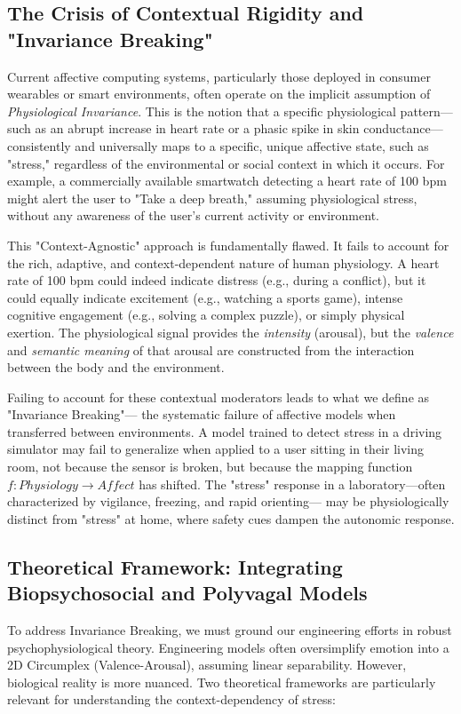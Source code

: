 \documentclass[journal]{IEEEtran}
\begin{document}
\subsection{The Crisis of Contextual Rigidity and "Invariance Breaking"}
Current affective computing systems, particularly those deployed in consumer wearables or smart environments, 
often operate on the implicit assumption of \textit{Physiological Invariance}. 
This is the notion that a specific physiological pattern—such as an abrupt increase in heart rate or a phasic spike in skin conductance—
consistently and universally maps to a specific, unique affective state, such as "stress," regardless of the environmental or social context in which it occurs. 
For example, a commercially available smartwatch detecting a heart rate of 100 bpm might alert the user to "Take a deep breath," assuming physiological stress, 
without any awareness of the user's current activity or environment.

This "Context-Agnostic" approach is fundamentally flawed. It fails to account for the rich, adaptive, and context-dependent nature of human physiology. 
A heart rate of 100 bpm could indeed indicate distress (e.g., during a conflict), but it could equally indicate excitement (e.g., watching a sports game), 
intense cognitive engagement (e.g., solving a complex puzzle), or simply physical exertion. 
The physiological signal provides the \textit{intensity} (arousal), but the \textit{valence} and \textit{semantic meaning} 
of that arousal are constructed from the interaction between the body and the environment.

Failing to account for these contextual moderators leads to what we define as "Invariance Breaking"—
the systematic failure of affective models when transferred between environments. 
A model trained to detect stress in a driving simulator may fail to generalize when applied to a user sitting in their living room, 
not because the sensor is broken, but because the mapping function $f: Physiology \rightarrow Affect$ has shifted. 
The "stress" response in a laboratory—often characterized by vigilance, freezing, and rapid orienting—
may be physiologically distinct from "stress" at home, where safety cues dampen the autonomic response.

\subsection{Theoretical Framework: Integrating Biopsychosocial and Polyvagal Models}
To address Invariance Breaking, we must ground our engineering efforts in robust psychophysiological theory. 
Engineering models often oversimplify emotion into a 2D Circumplex (Valence-Arousal), assuming linear separability. 
However, biological reality is more nuanced. Two theoretical frameworks are particularly relevant for understanding the context-dependency of stress:
\end{document}
